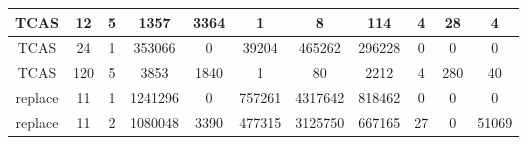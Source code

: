 \begin{table*}[]
\begin{tabular}{@{}ccccccccccc@{}}
        TCAS                                                     & 12                                                         & 5    & 1357                                                        & 3364                                                                      & 1                                                       & 8                                                          & 114                                                            & 4                                                         & 28                                                        & 4       \\ \midrule
        TCAS                                                     & 24                                                         & 1    & 353066                                                      & 0                                                                         & 39204                                                   & 465262                                                     & 296228                                                         & 0                                                         & 0                                                         & 0       \\ \midrule
        TCAS                                                     & 120                                                        & 5    & 3853                                                        & 1840                                                                      & 1                                                       & 80                                                         & 2212                                                           & 4                                                         & 280                                                       & 40      \\ \midrule
        replace                                                  & 11                                                         & 1    & 1241296                                                     & 0                                                                         & 757261                                                  & 4317642                                                    & 818462                                                         & 0                                                         & 0                                                         & 0       \\ \midrule
        replace                                                  & 11                                                         & 2    & 1080048                                                     & 3390                                                                      & 477315                                                  & 3125750                                                    & 667165                                                         & 27                                                        & 0                                                         & 51069   \\ \midrule

\end{tabular}
\end{table*}
